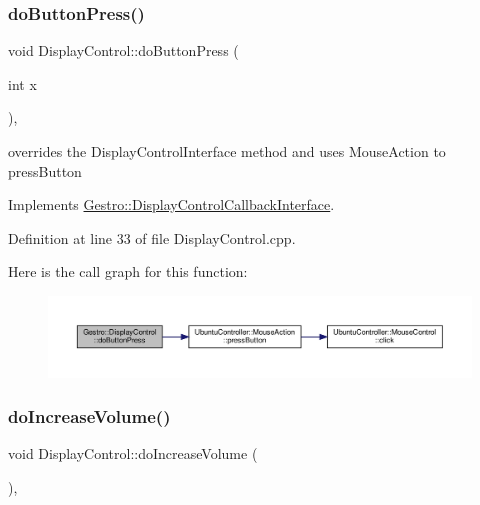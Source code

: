 \subsubsection{\texorpdfstring{do\+Button\+Press()}{doButtonPress()}}
{\footnotesize\ttfamily void Display\+Control\+::do\+Button\+Press (\begin{DoxyParamCaption}\item[{int}]{x }\end{DoxyParamCaption})\hspace{0.3cm}{\ttfamily [override]}, {\ttfamily [virtual]}}

overrides the Display\+Control\+Interface method and uses Mouse\+Action to press\+Button 

Implements \hyperlink{class_gestro_1_1_display_control_callback_interface_ab661600cad2743fd41253fb9cabbee51}{Gestro\+::\+Display\+Control\+Callback\+Interface}.



Definition at line 33 of file Display\+Control.\+cpp.

Here is the call graph for this function\+:
\nopagebreak
\begin{figure}[H]
\begin{center}
\leavevmode
\includegraphics[width=350pt]{class_gestro_1_1_display_control_a5f45c36e699afa1d56b2af78e5125aca_cgraph}
\end{center}
\end{figure}
\mbox{\label{class_gestro_1_1_display_control_a8a361b4c25ef55b86b5c2d178ffa516f}} 
\subsubsection{\texorpdfstring{do\+Increase\+Volume()}{doIncreaseVolume()}}
{\footnotesize\ttfamily void Display\+Control\+::do\+Increase\+Volume (\begin{DoxyParamCaption}{ }\end{DoxyParamCaption})\hspace{0.3cm}{\ttfamily [override]}, {\ttfamily [virtual]}}

